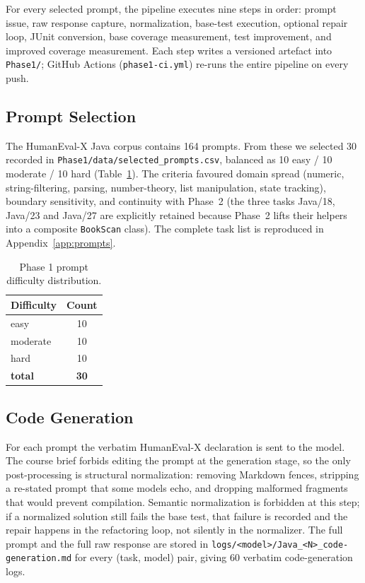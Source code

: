 \documentclass[journal]{IEEEtran}
\begin{document}
For every selected prompt, the pipeline executes nine steps in order:
prompt issue, raw response capture, normalization, base-test execution,
optional repair loop, JUnit conversion, base coverage measurement, test
improvement, and improved coverage measurement. Each step writes a
versioned artefact into \texttt{Phase1/}; GitHub Actions
(\texttt{phase1-ci.yml}) re-runs the entire pipeline on every push.

\subsection{Prompt Selection}

The HumanEval-X Java corpus contains 164 prompts. From these we selected 30
recorded in \texttt{Phase1/data/selected\_prompts.csv}, balanced as 10 easy
/ 10 moderate / 10 hard (Table~\ref{tab:difficulty}). The criteria favoured
domain spread (numeric, string-filtering, parsing, number-theory, list
manipulation, state tracking), boundary sensitivity, and continuity with
Phase~2 (the three tasks Java/18, Java/23 and Java/27 are explicitly
retained because Phase~2 lifts their helpers into a composite
\texttt{BookScan} class). The complete task list is reproduced in
Appendix~\ref{app:prompts}.

\begin{table}[!t]
\renewcommand{\arraystretch}{1.2}
\caption{Phase 1 prompt difficulty distribution.}
\label{tab:difficulty}
\centering
\begin{tabular}{@{}lc@{}}
\toprule
\textbf{Difficulty} & \textbf{Count} \\
\midrule
easy     & 10 \\
moderate & 10 \\
hard     & 10 \\
\midrule
\textbf{total} & \textbf{30} \\
\bottomrule
\end{tabular}
\end{table}

\subsection{Code Generation}

For each prompt the verbatim HumanEval-X declaration is sent to the model.
The course brief forbids editing the prompt at the generation stage, so the
only post-processing is structural normalization: removing Markdown fences,
stripping a re-stated prompt that some models echo, and dropping malformed
fragments that would prevent compilation. Semantic normalization is
forbidden at this step; if a normalized solution still fails the base
test, that failure is recorded and the repair happens in the refactoring
loop, not silently in the normalizer. The full prompt and the full raw
response are stored in \texttt{logs/<model>/Java\_<N>\_code-generation.md}
for every (task, model) pair, giving 60 verbatim code-generation logs.
\end{document}
